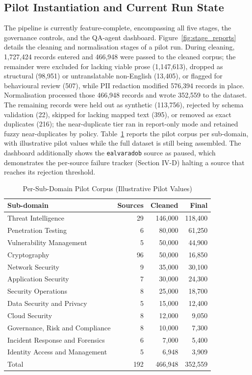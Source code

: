 \documentclass[conference]{IEEEtran}
\begin{document}
\subsection{Pilot Instantiation and Current Run State}
The pipeline is currently feature-complete, encompassing all five stages, the governance controls, and the QA-agent dashboard. Figure~\ref{fig:stage_reports} details the cleaning and normalisation stages of a pilot run. During cleaning, 1,727,424 records entered and 466,948 were passed to the cleaned corpus; the remainder were excluded for lacking viable prose (1,147,613), dropped as structural (98,951) or untranslatable non-English (13,405), or flagged for behavioural review (507), while PII redaction modified 576,394 records in place. Normalisation processed those 466,948 records and wrote 352,559 to the dataset. The remaining records were held out as synthetic (113,756), rejected by schema validation (22), skipped for lacking mapped text (395), or removed as exact duplicates (216); the near-duplicate tier ran in report-only mode and retained fuzzy near-duplicates by policy. Table~\ref{tab:domains} reports the pilot corpus per sub-domain, with illustrative pilot values while the full dataset is still being assembled. The dashboard additionally shows the \texttt{ealvaradob} source as paused, which demonstrates the per-source failure tracker (Section IV-D) halting a source that reaches its rejection threshold.

\begin{table}[t]
\caption{Per-Sub-Domain Pilot Corpus (Illustrative Pilot Values)}
\label{tab:domains}
\centering
\footnotesize
\renewcommand{\arraystretch}{1.15}
\begin{tabular}{|p{2.55cm}|r|r|r|}
\hline
Sub-domain & Sources & Cleaned & Final \\ \hline
Threat Intelligence & 29 & 146,000 & 118,400 \\ \hline
Penetration Testing & 6 & 80,000 & 61,250 \\ \hline
Vulnerability Management & 5 & 50,000 & 44,900 \\ \hline
Cryptography & 96 & 50,000 & 16,850 \\ \hline
Network Security & 9 & 35,000 & 30,100 \\ \hline
Application Security & 7 & 30,000 & 24,300 \\ \hline
Security Operations & 8 & 25,000 & 18,700 \\ \hline
Data Security and Privacy & 5 & 15,000 & 12,400 \\ \hline
Cloud Security & 8 & 12,000 & 9,050 \\ \hline
Governance, Risk and Compliance & 8 & 10,000 & 7,300 \\ \hline
Incident Response and Forensics & 6 & 7,000 & 5,400 \\ \hline
Identity Access and Management & 5 & 6,948 & 3,909 \\ \hline
Total & 192 & 466,948 & 352,559 \\ \hline
\end{tabular}
\end{table}
\end{document}
